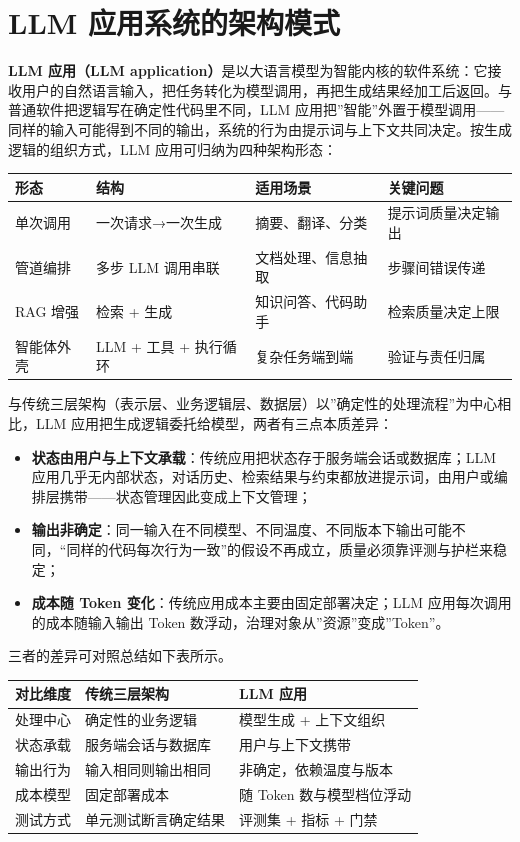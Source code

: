 \documentclass[
]{ctexbook}
\providecommand{\tightlist}{\setlength{\itemsep}{0pt}\setlength{\parskip}{0pt} }
\newcounter{none}
\begin{document}
\section{LLM
应用系统的架构模式}\label{llm-ux5e94ux7528ux7cfbux7edfux7684ux67b6ux6784ux6a21ux5f0f}

\textbf{LLM 应用（LLM
application）}是以大语言模型为智能内核的软件系统：它接收用户的自然语言输入，把任务转化为模型调用，再把生成结果经加工后返回。与普通软件把逻辑写在确定性代码里不同，LLM
应用把''智能''外置于模型调用------同样的输入可能得到不同的输出，系统的行为由提示词与上下文共同决定。按生成逻辑的组织方式，LLM
应用可归纳为四种架构形态：

{\def\LTcaptype{none} %
\begin{longtable}[]{@{}llll@{}}
\toprule\noalign{}
形态 & 结构 & 适用场景 & 关键问题 \\
\midrule\noalign{}
\endhead
\bottomrule\noalign{}
\endlastfoot
单次调用 & 一次请求→一次生成 & 摘要、翻译、分类 & 提示词质量决定输出 \\
管道编排 & 多步 LLM 调用串联 & 文档处理、信息抽取 & 步骤间错误传递 \\
RAG 增强 & 检索 + 生成 & 知识问答、代码助手 & 检索质量决定上限 \\
智能体外壳 & LLM + 工具 + 执行循环 & 复杂任务端到端 & 验证与责任归属 \\
\end{longtable}
}

与传统三层架构（表示层、业务逻辑层、数据层）以''确定性的处理流程''为中心相比，LLM
应用把生成逻辑委托给模型，两者有三点本质差异：

\begin{itemize}
\tightlist
\item
  \textbf{状态由用户与上下文承载}：传统应用把状态存于服务端会话或数据库；LLM
  应用几乎无内部状态，对话历史、检索结果与约束都放进提示词，由用户或编排层携带------状态管理因此变成上下文管理；
\item
  \textbf{输出非确定}：同一输入在不同模型、不同温度、不同版本下输出可能不同，``同样的代码每次行为一致''的假设不再成立，质量必须靠评测与护栏来稳定；
\item
  \textbf{成本随 Token 变化}：传统应用成本主要由固定部署决定；LLM
  应用每次调用的成本随输入输出 Token
  数浮动，治理对象从''资源''变成''Token''。
\end{itemize}

三者的差异可对照总结如下表所示。

{\def\LTcaptype{none} %
\begin{longtable}[]{@{}lll@{}}
\toprule\noalign{}
对比维度 & 传统三层架构 & LLM 应用 \\
\midrule\noalign{}
\endhead
\bottomrule\noalign{}
\endlastfoot
处理中心 & 确定性的业务逻辑 & 模型生成 + 上下文组织 \\
状态承载 & 服务端会话与数据库 & 用户与上下文携带 \\
输出行为 & 输入相同则输出相同 & 非确定，依赖温度与版本 \\
成本模型 & 固定部署成本 & 随 Token 数与模型档位浮动 \\
测试方式 & 单元测试断言确定结果 & 评测集 + 指标 + 门禁 \\
\end{longtable}
}
\end{document}
